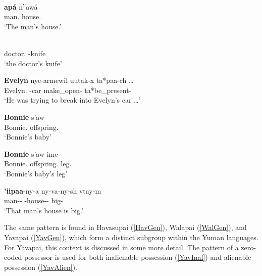 \begin{exe}\ex\label{CocGen}
\gll \textbf{ap\'a} n\textsuperscript{y}aw\'a\\
man.\acc{} house.\acc{}\\
\glt `The man's house.'
\end{exe}


\begin{exe}\ex\label{DieGen}
\gll \textbf{}  \\
doctor.\acc{} \poss{}-knife\\
\glt `the doctor's knife'
\end{exe}


\begin{exe}\ex\label{JamGen}
\gll \textbf{Evelyn} nye-armewil uutak-x ta*paa-ch \dots\\
Evelyn.\acc{} \ali{}-car make\_open-\irr{} ta*be\_present-\ssbj{}\\
\glt `He was trying to break into Evelyn's car \dots'
\end{exe} 

\begin{exe}\ex\label{MarGen}
\begin{xlist} 
\ex\gll \textbf{Bonnie} s'aw\\
Bonnie.\acc{} offspring.\acc{}\\
\glt `Bonnie's baby'

\ex\gll \textbf{Bonnie} s'aw ime\\
Bonnie.\acc{} offspring.\acc{} leg.\acc{}\\
\glt `Bonnie's baby's leg'

\ex\gll \textbf{'iipaa}-ny-a ny-va-ny-sh vtay-m\\
man-\dem{}-\augv{} \poss{}-house-\dem{}-\nom{} big-\rls{}\\
\glt `That man's house is big.'
\end{xlist}
\end{exe}

The same pattern is found in Havasupai (\ref{HavGen}), Walapai (\ref{WalGen}), and Yavapai (\ref{YavGen}), which form a distinct subgroup within the Yuman languages. 
For Yavapai, this context is discussed in some more detail. 
The pattern of a zero-coded possessor is used for both inalienable possession (\ref{YavInal}) and alienable possession (\ref{YavAlien}).
 

